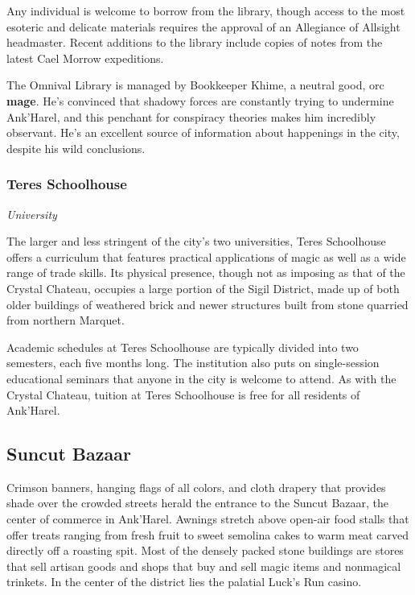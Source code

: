 \documentclass[a4paper, 11pt, bg=full, twocolumn, nooutline]{dndbook}
\begin{document}
Any individual is welcome to borrow from the library, though access to the most esoteric and delicate materials requires the approval of an Allegiance of Allsight headmaster. Recent additions to the library include copies of notes from the latest Cael Morrow expeditions.

The Omnival Library is managed by Bookkeeper Khime, a neutral good, orc \textbf{mage}. He's convinced that shadowy forces are constantly trying to undermine Ank'Harel, and this penchant for conspiracy theories makes him incredibly observant. He's an excellent source of information about happenings in the city, despite his wild conclusions.

\subsubsection{Teres Schoolhouse}

\textit{University}

The larger and less stringent of the city's two universities, Teres Schoolhouse offers a curriculum that features practical applications of magic as well as a wide range of trade skills. Its physical presence, though not as imposing as that of the Crystal Chateau, occupies a large portion of the Sigil District, made up of both older buildings of weathered brick and newer structures built from stone quarried from northern Marquet.

Academic schedules at Teres Schoolhouse are typically divided into two semesters, each five months long. The institution also puts on single-session educational seminars that anyone in the city is welcome to attend. As with the Crystal Chateau, tuition at Teres Schoolhouse is free for all residents of Ank'Harel.

\subsection{Suncut Bazaar}

Crimson banners, hanging flags of all colors, and cloth drapery that provides shade over the crowded streets herald the entrance to the Suncut Bazaar, the center of commerce in Ank'Harel. Awnings stretch above open-air food stalls that offer treats ranging from fresh fruit to sweet semolina cakes to warm meat carved directly off a roasting spit. Most of the densely packed stone buildings are stores that sell artisan goods and shops that buy and sell magic items and nonmagical trinkets. In the center of the district lies the palatial Luck's Run casino.
\end{document}
